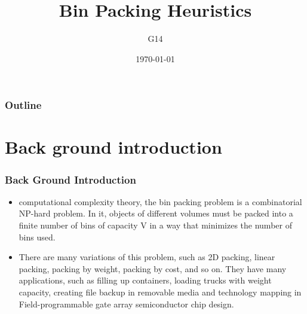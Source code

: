 \documentclass[slidestop,compress,mathserif,brown]{beamer}
\title{Bin Packing Heuristics}
\author{G14}
\date{\today}
\begin{document}
\begin{CJK}{UTF8}{kai}


\begin{frame}
\titlepage
\end{frame}

\begin{frame}[shrink=1]
\frametitle{Outline}
\tableofcontents
\end{frame}

\section{Back ground introduction}

\begin{frame}
\frametitle{Back Ground Introduction}
\begin{itemize}
	\item computational complexity theory, the bin packing problem is a combinatorial NP-hard problem. In it, objects of different volumes must be packed into a finite number of bins of capacity V in a way that minimizes the number of bins used.
	\item There are many variations of this problem, such as 2D packing, linear packing, packing by weight, packing by cost, and so on. They have many applications, such as filling up containers, loading trucks with weight capacity, creating file backup in removable media and technology mapping in Field-programmable gate array semiconductor chip design.
\end{itemize}
\end{frame}


\end{CJK}
\end{document}
